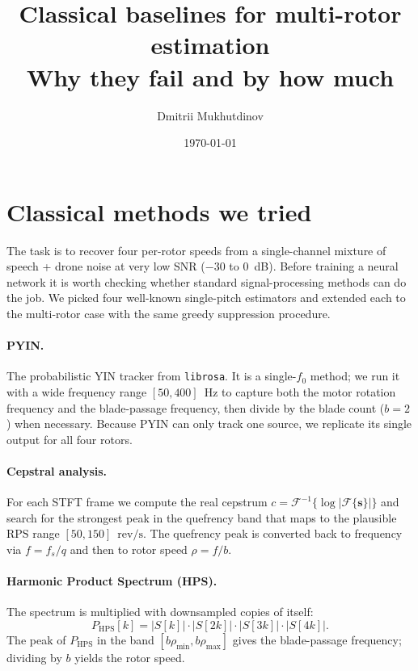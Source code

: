 \documentclass[11pt,a4paper]{article}
\title{\textbf{Classical baselines for multi-rotor \rps{} estimation}\\
  \large Why they fail and by how much}
\author{Dmitrii Mukhutdinov}
\date{\today}
\newcommand{\rps}{\ensuremath{\mathrm{RPS}}}
\newcommand{\revps}{\ensuremath{\mathrm{rev}/\mathrm{s}}}
\begin{document}
\maketitle

\section{Classical methods we tried}

The task is to recover four per-rotor speeds from a single-channel mixture of
speech + drone noise at very low SNR ($-30$ to $0$~dB).  Before training a
neural network it is worth checking whether standard signal-processing methods
can do the job.  We picked four well-known single-pitch estimators and extended
each to the multi-rotor case with the same greedy suppression procedure.

\paragraph{PYIN.} The probabilistic YIN tracker from \texttt{librosa}.  It is
a single-$f_0$ method; we run it with a wide frequency range $[50, 400]$~Hz to
capture both the motor rotation frequency and the blade-passage frequency, then
divide by the blade count ($b=2$) when necessary.  Because PYIN can only track
one source, we replicate its single output for all four rotors.

\paragraph{Cepstral analysis.} For each STFT frame we compute the real
cepstrum $c = \mathcal{F}^{-1}\{\log|\mathcal{F}\{\mathbf{s}\}|\}$ and search
for the strongest peak in the quefrency band that maps to the plausible
\rps{} range $[50, 150]$~\revps.  The quefrency peak is converted back to
frequency via $f = f_s / q$ and then to rotor speed $\rho = f / b$.

\paragraph{Harmonic Product Spectrum (HPS).} The spectrum is multiplied with
downsampled copies of itself:
\begin{equation}
  P_{\text{HPS}}[k] = |S[k]| \cdot |S[2k]| \cdot |S[3k]| \cdot |S[4k]|.
\end{equation}
The peak of $P_{\text{HPS}}$ in the band $[b\rho_{\min}, b\rho_{\max}]$
gives the blade-passage frequency; dividing by $b$ yields the rotor speed.
\end{document}
